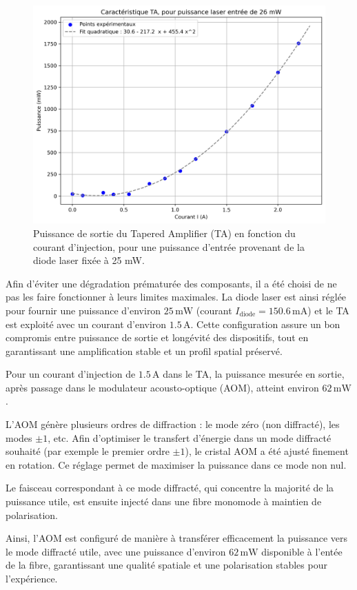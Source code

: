\begin{figure}[H]
    \centering
    \includegraphics[width=0.7\linewidth]{Dipolaire/Figures/Puissance_TA.png}
    \caption{Puissance de sortie du Tapered Amplifier (TA) en fonction du courant d’injection, pour une puissance d’entrée provenant de la diode laser fixée à 25 mW.}
    \label{fig:Puissance_TA}
\end{figure}

Afin d’éviter une dégradation prématurée des composants, il a été choisi de ne pas les faire fonctionner à leurs limites maximales. La diode laser est ainsi réglée pour fournir une puissance d’environ $25\,\text{mW}$ (courant $I_{\text{diode}} = 150.6\,\text{mA}$) et le TA est exploité avec un courant d’environ $1.5\,\text{A}$. Cette configuration assure un bon compromis entre puissance de sortie et longévité des dispositifs, tout en garantissant une amplification stable et un profil spatial préservé.


Pour un courant d’injection de $1.5\,\text{A}$ dans le TA, la puissance mesurée en sortie, après passage dans le modulateur acousto-optique (AOM), atteint environ $62\,\text{mW}$. 

L’AOM génère plusieurs ordres de diffraction : le mode zéro (non diffracté), les modes $\pm 1$, etc. Afin d’optimiser le transfert d’énergie dans un mode diffracté souhaité (par exemple le premier ordre $\pm 1$), le cristal AOM a été ajusté finement en rotation. Ce réglage permet de maximiser la puissance dans ce mode non nul.

Le faisceau correspondant à ce mode diffracté, qui concentre la majorité de la puissance utile, est ensuite injecté dans une fibre monomode à maintien de polarisation. 

Ainsi, l’AOM est configuré de manière à transférer efficacement la puissance vers le mode diffracté utile, avec une puissance d’environ $62\,\text{mW}$ disponible à l'entée de la fibre, garantissant une qualité spatiale et une polarisation stables pour l’expérience.



